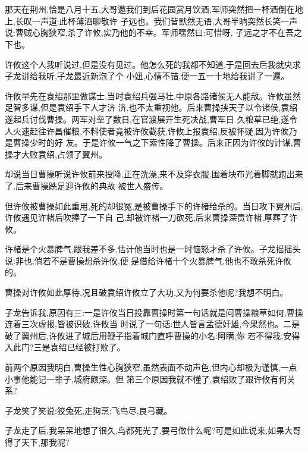 ﻿\documentclass[12pt,twocolumn]{article}
\begin{document}
\section{}

那天在荆州,恰是八月十五,大哥邀我们到后花园赏月饮酒,军师突然把一杯酒倒在地上,长叹一声道:此杯薄酒聊敬许
子远也。我们皆默然无语,大哥半晌突然长笑一声说:曹贼心胸狭窄,杀了许攸,实乃他的不幸。军师嘿然曰:可惜呀,
子远之才不在吾之下也。

许攸这个人我听说过,但是没有见过。他怎么死的我都不知道,于是回去后我就央求子龙讲给我听,子龙最近新泡了个
小妞,心情不错,便一五一十地给我讲了一遍。

许攸早先在袁绍那里做谋士,当时袁绍兵强马壮,中原各路诸侯无人能敌。许攸虽然足智多谋,但是袁绍手下人才济
济,也不太重视他。后来曹操挟天子以令诸侯,袁绍遂起兵讨伐曹操。两军对垒了数日,在官渡展开生死决战,曹军日
久粮草已绝,遂令人火速赶往许昌催粮,不料使者竟被许攸截获,许攸上报袁绍,反被怀疑,因为许攸乃是曹操少时的好
友。于是许攸一气之下索性降了曹操。后来正因为许攸的计谋,曹操才大败袁绍,占领了翼州。

却说当日曹操听说许攸前来投降,正在洗澡,来不及穿衣服,围着块布光着脚就跑出来了,后来曹操跣足迎许攸的典故
被世人盛传。

但许攸被曹操如此重用,死的却很冤,是被曹操手下的许楮给杀的。当日攻下翼州后,许攸遇见许楮后吹捧了一下自
己,却被许楮一刀砍死,后来曹操深责许楮,厚葬了许攸。

许楮是个火暴脾气,跟我差不多,估计他当时也是一时恼怒才杀了许攸。子龙摇摇头说:非也,倘若不是曹操想杀许攸,便
是借给许楮十个火暴脾气,他也不敢杀死许攸的。

曹操对许攸如此厚待,况且破袁绍许攸立了大功,又为何要杀他呢?我想不明白。

子龙告诉我,原因有三:一是许攸当日投靠曹操时第一句话就是问曹操粮草如何,曹操连着三次虚报,皆被识破,许攸当
时说了一句话:世人皆言孟德奸雄,今果然也。二是破了翼州后,许攸进了城后用鞭子指着城门直呼曹操的小名:阿瞒,你
若不得我,安得入此门?三是袁绍已经被打败了。

前两个原因我明白,曹操生性心胸狭窄,虽然表面不动声色,但内心却极为谨慎,一点小事他能记一辈子,城府颇深。但
第三个原因我就不懂了,袁绍败了跟许攸有何关系?

子龙笑了笑说:狡兔死,走狗烹;飞鸟尽,良弓藏。

子龙走了后,我呆呆地想了很久,鸟都死光了,要弓做什么呢?可是如此说来,如果大哥得了天下,那我呢?

\section{}
\end{document}
